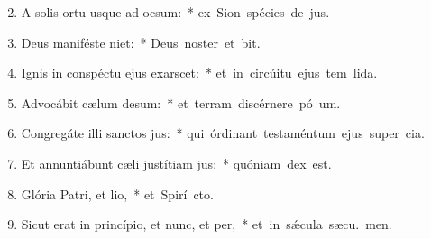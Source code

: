 \begin{flushleft}
\begin{enumerate}[leftmargin=*]
\setcounter{enumi}{1}

\item A solis ortu usque ad ocsum:~* \mbox{ex Sion spécies de jus.}
\item Deus maniféste niet:~* \mbox{Deus noster et  bit.}
\item Ignis in conspéctu ejus exarscet:~* \mbox{et in circúitu ejus tem lida.}
\item Advocábit cælum desum:~* \mbox{et terram discérnere pó um.}
\item Congregáte illi sanctos jus:~* \mbox{qui órdinant testaméntum ejus super cia.}
\item Et annuntiábunt cæli justítiam jus:~* \mbox{quóniam  dex est.}
\item Glória Patri, et lio,~* \mbox{et Spirí cto.}
\item Sicut erat in princípio, et nunc, et per,~* \mbox{et in s\'{\ae}cula sæcu. men.}

\end{enumerate}
\end{flushleft}

